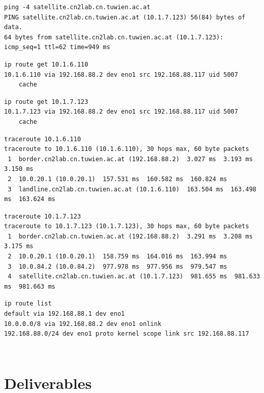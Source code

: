 \documentclass[parskip=full]{scrartcl}
\begin{document}
\begin{verbatim}
ping -4 satellite.cn2lab.cn.tuwien.ac.at
PING satellite.cn2lab.cn.tuwien.ac.at (10.1.7.123) 56(84) bytes of data.
64 bytes from satellite.cn2lab.cn.tuwien.ac.at (10.1.7.123): icmp_seq=1 ttl=62 time=949 ms
\end{verbatim}

\begin{verbatim}
ip route get 10.1.6.110
10.1.6.110 via 192.168.88.2 dev eno1 src 192.168.88.117 uid 5007
    cache
\end{verbatim}

\begin{verbatim}
ip route get 10.1.7.123
10.1.7.123 via 192.168.88.2 dev eno1 src 192.168.88.117 uid 5007
    cache
\end{verbatim}

\begin{verbatim}
traceroute 10.1.6.110
traceroute to 10.1.6.110 (10.1.6.110), 30 hops max, 60 byte packets
 1  border.cn2lab.cn.tuwien.ac.at (192.168.88.2)  3.027 ms  3.193 ms  3.150 ms
 2  10.0.20.1 (10.0.20.1)  157.531 ms  160.582 ms  160.824 ms
 3  landline.cn2lab.cn.tuwien.ac.at (10.1.6.110)  163.504 ms  163.498 ms  163.624 ms
\end{verbatim}

\begin{verbatim}
traceroute 10.1.7.123
traceroute to 10.1.7.123 (10.1.7.123), 30 hops max, 60 byte packets
 1  border.cn2lab.cn.tuwien.ac.at (192.168.88.2)  3.291 ms  3.208 ms  3.175 ms
 2  10.0.20.1 (10.0.20.1)  158.759 ms  164.016 ms  163.994 ms
 3  10.0.84.2 (10.0.84.2)  977.978 ms  977.956 ms  979.547 ms
 4  satellite.cn2lab.cn.tuwien.ac.at (10.1.7.123)  981.655 ms  981.633 ms  981.663 ms
\end{verbatim}

\begin{verbatim}
ip route list
default via 192.168.88.1 dev eno1 
10.0.0.0/8 via 192.168.88.2 dev eno1 onlink 
192.168.88.0/24 dev eno1 proto kernel scope link src 192.168.88.117 
\end{verbatim}
\begin{verbatim}

\end{verbatim}
\begin{verbatim}

\end{verbatim}


\section{Deliverables}
\end{document}
